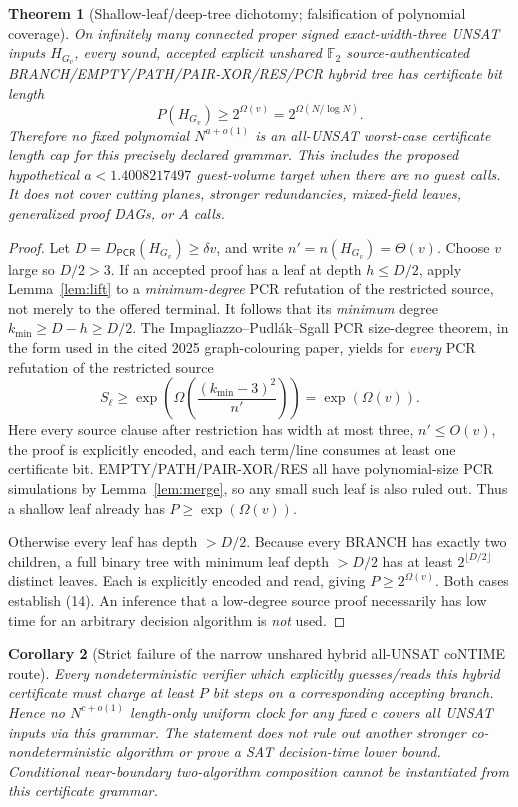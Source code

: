 \documentclass[11pt]{article}
\newtheorem{theorem}{Theorem}
\newtheorem{corollary}[theorem]{Corollary}
\newcommand{\PCR}{\mathsf{PCR}}
\begin{document}
\begin{theorem}[Shallow-leaf/deep-tree dichotomy; falsification of polynomial coverage]\label{th:barrier}
On infinitely many \emph{connected} proper signed exact-width-three UNSAT inputs $H_{G_v}$, every sound, accepted \emph{explicit unshared} $\mathbb F_2$ source-authenticated BRANCH/EMPTY/PATH/PAIR-XOR/RES/PCR hybrid tree has certificate bit length
\[
\boxed{P(H_{G_v})\ge 2^{\Omega(v)}
 =2^{\Omega(N/\log N)}.}\tag{14}
\]
Therefore no fixed polynomial $N^{a+o(1)}$ is an all-UNSAT worst-case certificate length cap for this precisely declared grammar. This includes the proposed hypothetical $a<1.4008217497$ guest-volume target when there are no guest calls. It does \emph{not} cover cutting planes, stronger redundancies, mixed-field leaves, generalized proof DAGs, or $A$ calls.
\end{theorem}
\begin{proof}
Let $D=D_{\PCR}(H_{G_v})\ge\delta v$, and write $n'=n(H_{G_v})=\Theta(v)$. Choose $v$ large so $D/2>3$. If an accepted proof has a leaf at depth $h\le D/2$, apply Lemma~\ref{lem:lift} to a \emph{minimum-degree} PCR refutation of the restricted source, not merely to the offered terminal. It follows that its \emph{minimum} degree $k_{\min}\ge D-h\ge D/2$. The Impagliazzo--Pudl\'ak--Sgall PCR size-degree theorem, in the form used in the cited 2025 graph-colouring paper, yields for \emph{every} PCR refutation of the restricted source
\[
 S_\ell\ge\exp\!\left(\Omega\!\left(\frac{(k_{\min}-3)^2}{n'}\right)\right)
 =\exp(\Omega(v)).\tag{15}
\]
Here every source clause after restriction has width at most three, $n'\le O(v)$, the proof is explicitly encoded, and each term/line consumes at least one certificate bit. EMPTY/PATH/PAIR-XOR/RES all have polynomial-size PCR simulations by Lemma~\ref{lem:merge}, so any small such leaf is also ruled out. Thus a shallow leaf already has $P\ge\exp(\Omega(v))$.

Otherwise every leaf has depth $>D/2$. Because every BRANCH has exactly two children, a full binary tree with minimum leaf depth $>D/2$ has at least $2^{\lfloor D/2\rfloor}$ distinct leaves. Each is explicitly encoded and read, giving $P\ge 2^{\Omega(v)}$. Both cases establish (14). An inference that a low-degree source proof necessarily has low time for an arbitrary decision algorithm is \emph{not} used.
\end{proof}

\begin{corollary}[Strict failure of the narrow unshared hybrid all-UNSAT coNTIME route]
Every nondeterministic verifier which explicitly guesses/reads this hybrid certificate must charge at least $P$ bit steps on a corresponding accepting branch. Hence no \(N^{c+o(1)}\) length-only uniform clock for any fixed $c$ covers all UNSAT inputs \emph{via this grammar}. The statement does not rule out another stronger co-nondeterministic algorithm or prove a SAT decision-time lower bound. Conditional near-boundary two-algorithm composition cannot be instantiated from this certificate grammar.
\end{corollary}
\end{document}
